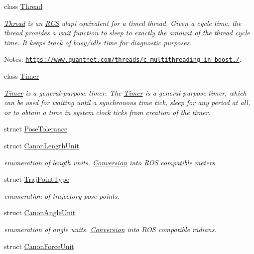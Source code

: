 \begin{DoxyCompactItemize}
class \hyperlink{classRCS_1_1Thread}{Thread}
\begin{DoxyCompactList}\small\item\em \hyperlink{classRCS_1_1Thread}{Thread} is an \hyperlink{namespaceRCS}{R\-C\-S} ulapi equivalent for a timed thread. Given a cycle time, the thread provides a wait function to sleep to exactly the amount of the thread cycle time. It keeps track of busy/idle time for diagnostic purposes. \par
 Notes\-: \href{https://www.quantnet.com/threads/c-multithreading-in-boost.10028/}{\tt https\-://www.\-quantnet.\-com/threads/c-\/multithreading-\/in-\/boost./}. \end{DoxyCompactList}\item 
class \hyperlink{classRCS_1_1Timer}{Timer}
\begin{DoxyCompactList}\small\item\em \hyperlink{classRCS_1_1Timer}{Timer} is a general-\/purpose timer. The \hyperlink{classRCS_1_1Timer}{Timer} is a general-\/purpose timer, which can be used for waiting until a synchronous time tick, sleep for any period at all, or to obtain a time in system clock ticks from creation of the timer. \end{DoxyCompactList}\item 
struct \hyperlink{structRCS_1_1PoseTolerance}{Pose\-Tolerance}
\item 
struct \hyperlink{structRCS_1_1CanonLengthUnit}{Canon\-Length\-Unit}
\begin{DoxyCompactList}\small\item\em enumeration of length units. \hyperlink{namespaceConversion}{Conversion} into R\-O\-S compatible meters. \end{DoxyCompactList}\item 
struct \hyperlink{structRCS_1_1TrajPointType}{Traj\-Point\-Type}
\begin{DoxyCompactList}\small\item\em enumeration of trajectory pose points. \end{DoxyCompactList}\item 
struct \hyperlink{structRCS_1_1CanonAngleUnit}{Canon\-Angle\-Unit}
\begin{DoxyCompactList}\small\item\em enumeration of angle units. \hyperlink{namespaceConversion}{Conversion} into R\-O\-S compatible radians. \end{DoxyCompactList}\item 
struct \hyperlink{structRCS_1_1CanonForceUnit}{Canon\-Force\-Unit}

\end{DoxyCompactItemize}
